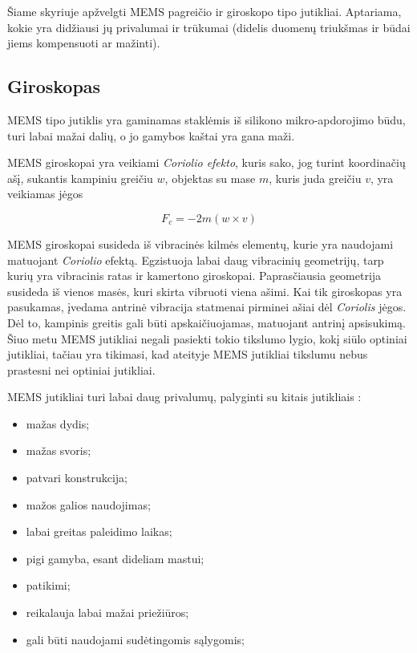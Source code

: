 Šiame skyriuje apžvelgti MEMS pagreičio ir giroskopo tipo jutikliai. 
Aptariama, kokie yra didžiausi jų privalumai ir trūkumai (didelis duomenų triukšmas ir būdai jiems kompensuoti ar mažinti).

\subsection{Giroskopas}

MEMS tipo jutiklis \cite{perlmutter2012high} yra gaminamas staklėmis iš silikono mikro-apdorojimo būdu, turi labai mažai dalių, o jo gamybos kaštai yra gana maži.

MEMS giroskopai yra veikiami \textit{Coriolio efekto}, kuris sako, jog turint koordinačių ašį, sukantis kampiniu greičiu $w$, objektas su mase $m$, kuris juda greičiu $v$, yra veikiamas jėgos

\begin{equation}
    F_c = -2m(w \times v)
\end{equation}

MEMS giroskopai susideda iš vibracinės kilmės elementų, kurie yra naudojami matuojant \textit{Coriolio} efektą. 
Egzistuoja labai daug vibracinių geometrijų, tarp kurių yra vibracinis ratas ir kamertono giroskopai. 
Paprasčiausia geometrija susideda iš vienos masės, kuri skirta vibruoti viena ašimi. 
Kai tik giroskopas yra pasukamas, įvedama antrinė vibracija statmenai pirminei ašiai dėl \textit{Coriolis} jėgos. 
Dėl to, kampinis greitis gali būti apskaičiuojamas, matuojant antrinį apsisukimą. 
Šiuo metu MEMS jutikliai negali pasiekti tokio tikslumo lygio, kokį siūlo optiniai jutikliai, tačiau yra tikimasi, kad ateityje MEMS jutikliai tikslumu nebus prastesni nei optiniai jutikliai.

MEMS jutikliai turi labai daug privalumų, palyginti su kitais jutikliais \cite{titterton2004strapdown}:

\begin{itemize}
    \item mažas dydis;
    \item mažas svoris;
    \item patvari konstrukcija;
    \item mažos galios naudojimas;
    \item labai greitas paleidimo laikas;
    \item pigi gamyba, esant dideliam mastui;
    \item patikimi;
    \item reikalauja labai mažai priežiūros;
    \item gali būti naudojami sudėtingomis sąlygomis;
\end{itemize}

